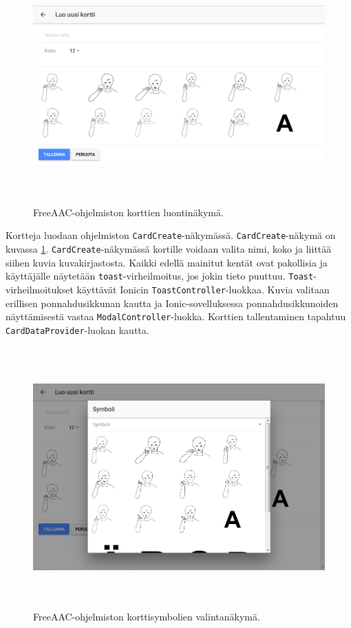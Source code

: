 \documentclass[utf8]{gradu3}
\begin{document}
\begin{figure}[h]\centering
  \includegraphics[height=9cm,keepaspectratio]{card-create-layout}
  \caption[FreeAAC-ohjelmiston korttien luontinäkymä.]
  {FreeAAC-ohjelmiston korttien luontinäkymä.}
  \label{fig:card-create-layout}
\end{figure}

Kortteja luodaan ohjelmiston \texttt{CardCreate}-näkymässä. \texttt{CardCreate}-näkymä on kuvassa \ref{fig:card-create-layout}. \texttt{CardCreate}-näkymässä kortille voidaan valita nimi, koko ja liittää siihen kuvia kuvakirjastosta. Kaikki edellä mainitut kentät ovat pakollisia ja käyttäjälle näytetään \texttt{toast}-virheilmoitus, jos jokin tieto puuttuu. \texttt{Toast}-virheilmoitukset käyttävät Ionicin \texttt{ToastController}-luokkaa. Kuvia valitaan erillisen ponnahdusikkunan kautta ja Ionic-sovelluksessa ponnahdusikkunoiden näyttämisestä vastaa \texttt{ModalController}-luokka. Korttien tallentaminen tapahtuu \texttt{CardDataProvider}-luokan kautta.

\begin{figure}[h]\centering
  \includegraphics[height=10cm,keepaspectratio]{select-symbol-modal-layout}
  \caption[FreeAAC-ohjelmiston korttisymbolien valintanäkymä.]
  {FreeAAC-ohjelmiston korttisymbolien valintanäkymä.}
  \label{fig:select-symbol-modal-layout}
\end{figure}
\end{document}
